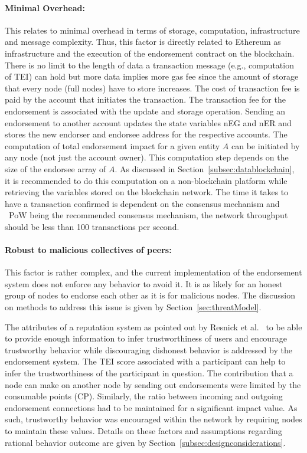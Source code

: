 \paragraph{Minimal Overhead:}This relates to minimal overhead in terms of
storage, computation, infrastructure and message complexity. Thus, this factor
is directly related to Ethereum as infrastructure and the execution of the
endorsement contract on the blockchain. There is no limit to the length of data
a transaction message (e.g., computation of \ac{TEI}) can hold but more data
implies more gas fee since the amount of storage that every node (full nodes)
have to store increases. The cost of transaction fee is paid by the account
that initiates the transaction. The transaction fee for the endorsement is
associated with the update and storage operation. Sending an endorsement to
another account updates the state variables \ac{nEG} and \ac{nER} and stores
the new endorser and endorsee address for the respective accounts. The
computation of total endorsement impact for a given entity $A$ can be initiated
by any node (not just the account owner). This computation step depends on the
size of the endorsee array of $A$. As discussed in
Section~\ref{subsec:datablockchain}, it is recommended to do this computation
on a non-blockchain platform while retrieving the variables stored on the
blockchain network. The time it takes to have a transaction confirmed is
dependent on the consensus mechanism and ~\ac{PoW} being the recommended
consensus mechanism, the network throughput should be less than 100
transactions per second.  \paragraph{Robust to malicious collectives of
peers:}This factor is rather complex, and the current implementation of the
endorsement system does not enforce any behavior to avoid it. It is as likely
for an honest group of nodes to endorse each other as it is for malicious
nodes. The discussion on methods to address this issue is given by
Section~\ref{sec:threatModel}. 

The attributes of a reputation system as pointed out by Resnick et
al.~\cite{resnick2000reputation} to be able to provide enough information to
infer trustworthiness of users and encourage trustworthy behavior while
discouraging dishonest behavior is addressed by the endorsement system. The
\ac{TEI} score associated with a participant can help to infer the
trustworthiness of the participant in question. The contribution that a node
can make on another node by sending out endorsements were limited by the
consumable points (\ac{CP}). Similarly, the ratio between incoming and outgoing
endorsement connections had to be maintained for a significant impact value. As
such, trustworthy behavior was encouraged within the network by requiring nodes
to maintain these values. Details on these factors and assumptions regarding
rational behavior outcome are given by
Section~\ref{subsec:designconsiderations}. \par 

